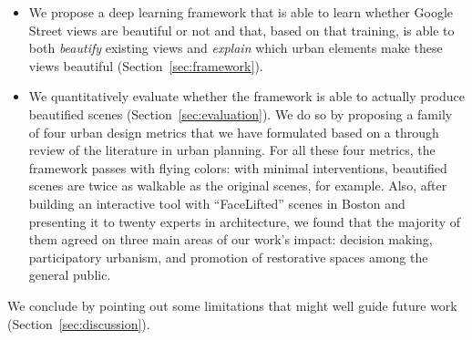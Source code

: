 \begin{itemize}
\item We propose a deep learning framework that is able to learn whether Google Street views are beautiful or not and that, based on that training, is able to both \emph{beautify} existing views and \emph{explain} which urban elements  make these views beautiful (Section~\ref{sec:framework}). 

\item We quantitatively evaluate whether the framework is able to actually produce beautified scenes (Section~\ref{sec:evaluation}). We do so by proposing a family of four urban design metrics that we have formulated based on a through review of the literature in urban planning. For all these four metrics, the framework passes with flying colors: with minimal interventions, beautified scenes are twice as walkable as the original scenes, for example. Also, after building an interactive tool with ``FaceLifted'' scenes in Boston and presenting it to twenty experts in architecture,  we found that the majority of them agreed on three main areas of our work's impact: decision making, participatory urbanism, and promotion of restorative spaces among the general public. 

\end{itemize}

We conclude by pointing out some limitations that might well guide future work (Section~\ref{sec:discussion}).



